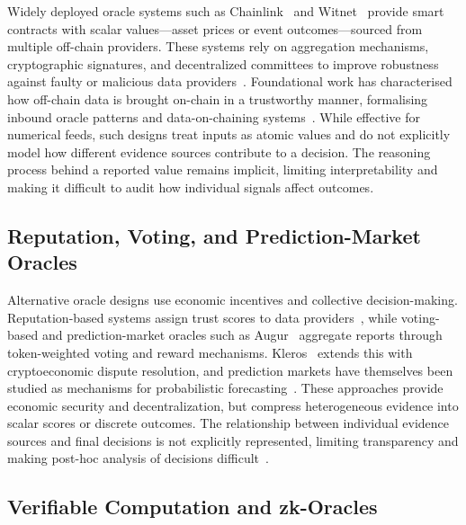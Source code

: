 \documentclass[journal]{IEEEtran}
\theoremstyle{definition}
\theoremstyle{remark}
\begin{document}
Widely deployed oracle systems such as
Chainlink~\cite{breidenbach2021chainlink} and
Witnet~\cite{de2017witnet} provide smart contracts
with scalar values---asset prices or event
outcomes---sourced from multiple off-chain providers.
These systems rely on aggregation mechanisms,
cryptographic signatures, and decentralized committees
to improve robustness against faulty or malicious data
providers~\cite{pasdar2023connect,ezzat2022blockchain,mammadzada2020blockchain}.
Foundational work has characterised how off-chain data is
brought on-chain in a trustworthy manner, formalising
inbound oracle patterns and data-on-chaining
systems~\cite{heiss2019oracles,muhlberger2020foundational}.
While effective for numerical feeds, such designs treat
inputs as atomic values and do not explicitly model how
different evidence sources contribute to a decision.
The reasoning process behind a reported value remains
implicit, limiting interpretability and making it
difficult to audit how individual signals affect
outcomes.

\subsection{Reputation, Voting, and Prediction-Market
Oracles}

Alternative oracle designs use economic incentives and
collective decision-making.
Reputation-based systems assign trust scores to data
providers~\cite{chen2022decentralized,nelaturu2020public,
arshad2022reputable}, while voting-based and
prediction-market oracles such as
Augur~\cite{peterson2015augur} aggregate reports through
token-weighted voting and reward mechanisms.
Kleros~\cite{lesaege2019kleros} extends this with
cryptoeconomic dispute resolution, and prediction markets
have themselves been studied as mechanisms for
probabilistic forecasting~\cite{shamsi2021prediction}.
These approaches provide economic security and
decentralization, but compress heterogeneous evidence
into scalar scores or discrete outcomes.
The relationship between individual evidence sources and
final decisions is not explicitly represented, limiting
transparency and making post-hoc analysis of decisions
difficult~\cite{pasdar2021blockchain}.

\subsection{Verifiable Computation and zk-Oracles}
\end{document}
